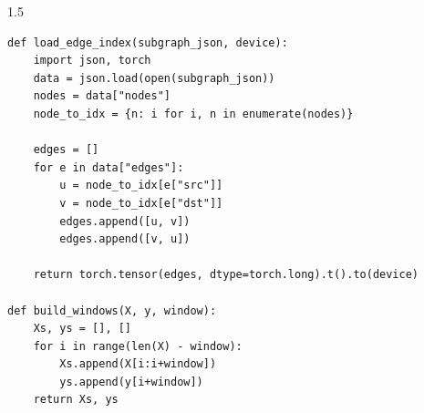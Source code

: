 \begin{spacing}{1.5}
\begin{verbatim}
def load_edge_index(subgraph_json, device):
    import json, torch
    data = json.load(open(subgraph_json))
    nodes = data["nodes"]
    node_to_idx = {n: i for i, n in enumerate(nodes)}

    edges = []
    for e in data["edges"]:
        u = node_to_idx[e["src"]]
        v = node_to_idx[e["dst"]]
        edges.append([u, v])
        edges.append([v, u])  

    return torch.tensor(edges, dtype=torch.long).t().to(device)

def build_windows(X, y, window):
    Xs, ys = [], []
    for i in range(len(X) - window):
        Xs.append(X[i:i+window])
        ys.append(y[i+window])
    return Xs, ys
\end{verbatim}

\end{spacing}